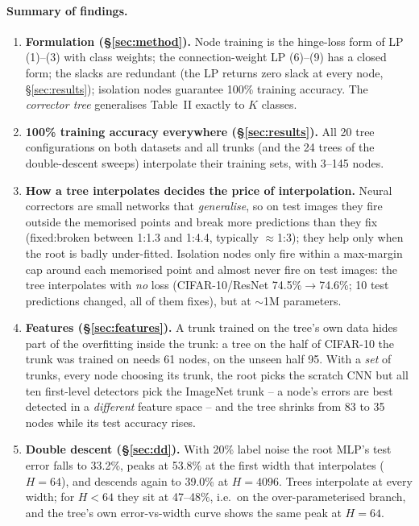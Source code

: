 \paragraph{Summary of findings.}
\begin{enumerate}[leftmargin=*]
\item \textbf{Formulation (\S\ref{sec:method}).} Node training is the hinge-loss form of LP (1)--(3)
  with class weights; the connection-weight LP (6)--(9) has a closed form; the slacks are
  redundant (the LP returns zero slack at every node, \S\ref{sec:results}); isolation nodes guarantee
  100\% training accuracy. The \emph{corrector tree} generalises Table~II exactly to $K$ classes.
\item \textbf{100\% training accuracy everywhere (\S\ref{sec:results}).} All 20 tree
  configurations on both datasets and all trunks (and the 24 trees of the double-descent sweeps)
  interpolate their training sets, with 3--145 nodes.
\item \textbf{How a tree interpolates decides the price of interpolation.} Neural correctors are
  small networks that \emph{generalise}, so on test images they fire outside the memorised points
  and break more predictions than they fix (fixed:broken between 1:1.3 and 1:4.4, typically $\approx$1:3);
  they help only when the root is badly under-fitted. Isolation nodes
  only fire within a max-margin cap around each memorised point and almost never fire on test
  images: the tree interpolates with \emph{no} loss (CIFAR-10/ResNet 74.5\%$\to$74.6\%; 10 test
  predictions changed, all of them fixes), but at $\sim$1M parameters.
\item \textbf{Features (\S\ref{sec:features}).} A trunk trained on the tree's own data hides part
  of the overfitting inside the trunk: a tree on the half of CIFAR-10 the trunk was trained on needs
  61 nodes, on the unseen half 95. With a \emph{set} of trunks, every node choosing its trunk, the root
  picks the scratch CNN but all ten first-level detectors pick the ImageNet trunk -- a node's errors are
  best detected in a \emph{different} feature space -- and the tree shrinks from 83 to 35 nodes while
  its test accuracy rises.
\item \textbf{Double descent (\S\ref{sec:dd}).} With 20\% label noise the root MLP's test error
  falls to 33.2\%, peaks at 53.8\% at the first width that interpolates ($H=64$), and descends again
  to 39.0\% at $H=4096$. Trees interpolate at every width; for $H<64$ they sit at 47--48\%, i.e.\ on
  the over-parameterised branch, and the tree's own error-vs-width curve shows the same peak at $H=64$.

\end{enumerate}
